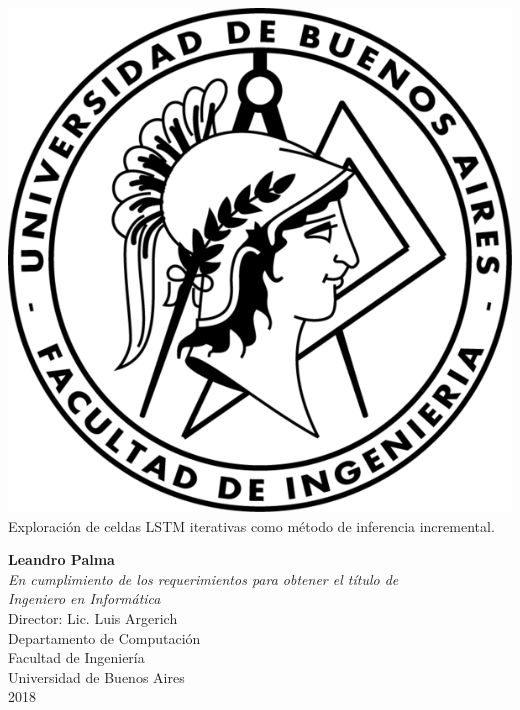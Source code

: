 \documentclass{article}
\begin{document}
	\begin{titlepage}
		
		\vspace*{\fill}
		\begin{center}
			
			\includegraphics[scale=1]{fiuba.png}\\
			\quad\linebreak
			\quad\linebreak
			\huge Exploración de celdas LSTM iterativas como método de inferencia incremental.
			\quad\linebreak
			
			\quad\linebreak
			\large \textbf{Leandro Palma}\\
			\quad\linebreak	
			\quad\linebreak
			\textit{En cumplimiento de los requerimientos para obtener el título de\\
				Ingeniero en Informática}\\
			\quad\linebreak
			\quad\linebreak
			Director: Lic. Luis Argerich\\
			
			\quad\linebreak
			\quad\linebreak
			Departamento de Computación\\
			
			Facultad de Ingeniería\\
			
			Universidad de Buenos Aires\\
			
			2018
		\end{center}
		
		\vspace*{\fill}
	\end{titlepage}
	
\end{document}
